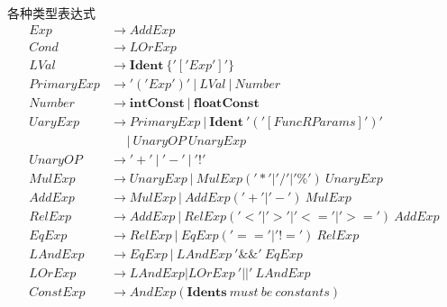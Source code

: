 各种类型表达式
\begin{align*}
    Exp &\longrightarrow AddExp\\   
    Cond &\longrightarrow LOrExp\\
    LVal &\longrightarrow \mathbf{Ident}\ \{'['Exp']'\}\ \\
    PrimaryExp &\longrightarrow '('Exp')' \ |\ LVal\ |\ Number\\
    Number &\longrightarrow \mathbf{intConst}\ |\ \mathbf{floatConst}\\
    UaryExp &\longrightarrow PrimaryExp \ |\ \mathbf{Ident}\ '('[FuncRParams]')'\\
    &\ \ \ \ \ \ |\ UnaryOP\ UnaryExp\\
    UnaryOP &\longrightarrow '+'\ |\ '-'\ |\ '!'\\
    MulExp &\longrightarrow UnaryExp\ |\ MulExp('*'|'/'|'\%')\ UnaryExp\\
    AddExp &\longrightarrow MulExp\ |\ AddExp('+'|'-')\ MulExp\\
    RelExp &\longrightarrow AddExp\ |\ RelExp('<'|'>'|'<='|'>=')\ AddExp\\
    EqExp &\longrightarrow RelExp\ |\ EqExp('=='|'!=')\ RelExp\\
    LAndExp &\longrightarrow EqExp\ |\ LAndExp\ '\&\&'\ EqExp\\
    LOrExp &\longrightarrow LAndExp | LOrExp\ '||'\ LAndExp\\
    ConstExp &\longrightarrow AndExp(\mathbf{Idents}\ must\ be\ constants)
\end{align*}

